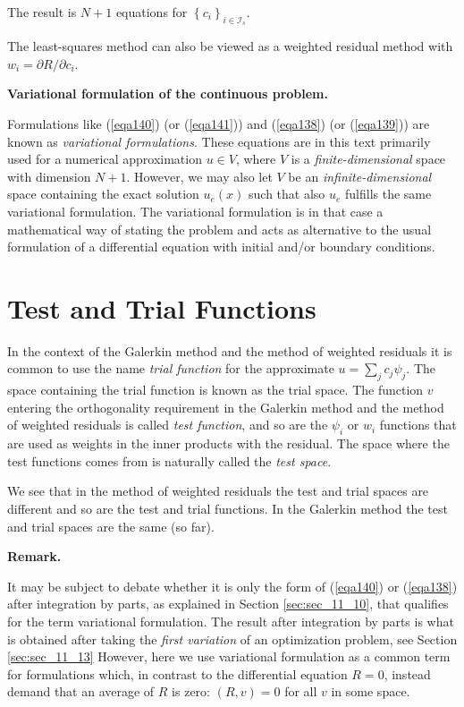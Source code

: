 \documentclass[../main.tex]{subfiles}
\begin{document}
	\noindent The result is $N+1$ equations for $\left\{c_{i}\right\}_{i \in \mathcal{I}_{s}}$.

	The least-squares method can also be viewed as a weighted residual method with $w_{i}=\partial R / \partial c_{i}$.
	
	\begin{mybox}
		\textbf{Variational formulation of the continuous problem.}
		
		\noindent Formulations like (\ref{eqa140}) (or (\ref{eqa141})) and (\ref{eqa138}) (or (\ref{eqa139})) are known as \emph{variational formulations}. These equations are in this text primarily used for a numerical approximation $u \in V$, where $V$ is a \emph{finite-dimensional} space with dimension $N+1$. However, we may also let $V$ be an \emph{infinite-dimensional} space containing the exact solution $u_{e}(x)$ such that also $u_{e}$ fulfills the same variational formulation. The variational formulation is in that case a mathematical way of stating the problem and acts as alternative to the usual formulation of a differential equation with initial and/or boundary conditions.
	\end{mybox}
	
	
\section[Test and Trial Functions]{Test and Trial Functions} 
	\label{sec:sec_11_7}
	\noindent In the context of the Galerkin method and the method of weighted residuals it is common to use the name \emph{trial function} for the approximate $u=\sum_{j} c_{j} \psi_{j}$. The space containing the trial function is known as the trial space. The function $v$ entering the orthogonality requirement in the Galerkin method and the method of weighted residuals is called \emph{test function}, and so are the $\psi_{i}$ or $w_{i}$ functions that are used as weights in the inner products with the residual. The space where the test functions comes from is naturally called the \emph{test space}.
	
	We see that in the method of weighted residuals the test and trial spaces are different and so are the test and trial functions. In the Galerkin method the test and trial spaces are the same (so far).
	
	\begin{mybox}
		\textbf{Remark.}
		
		\noindent It may be subject to debate whether it is only the form of (\ref{eqa140}) or (\ref{eqa138}) after integration by parts, as explained in Section \ref{sec:sec_11_10}, that qualifies for the term variational formulation. The result after integration by parts is what is obtained after taking the \emph{first variation} of an optimization problem, see Section \ref{sec:sec_11_13} However, here we use variational formulation as a common term for formulations which, in contrast to the differential equation $R=0$, instead demand that an average of $R$ is zero: $(R, v)=0$ for all $v$ in some space.
	\end{mybox}
	
\end{document}

